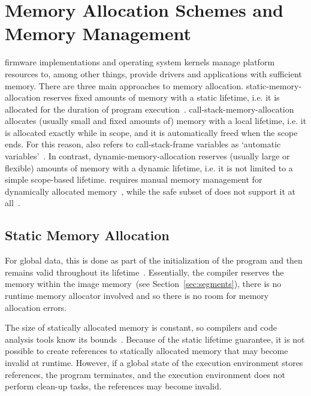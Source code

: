\section{Memory Allocation Schemes and Memory Management}

\Gls{firmware} implementations and operating system kernels manage platform resources to, among other things, provide drivers and applications with sufficient memory. There are three main approaches to memory allocation. \Gls{static-memory-allocation} reserves fixed amounts of memory with a static lifetime, i.e. it is allocated for the duration of program execution~\cite{ISO:2018:III,rust-ref}. \Gls{call-stack-memory-allocation} allocates (usually small and fixed amounts of) memory with a local lifetime, i.e. it is allocated exactly while in scope, and it is automatically freed when the scope ends. For this reason,  also refers to \gls{call-stack-frame} variables as `automatic variables'~\cite{ISO:2018:III}. In contrast, \gls{dynamic-memory-allocation} reserves (usually large or flexible) amounts of memory with a dynamic lifetime, i.e. it is not limited to a simple scope-based lifetime.  requires manual memory management for dynamically allocated memory~\cite{ISO:2018:III}, while the safe subset of  does not support it at all~\cite{rust-ref}.

\subsection{Static Memory Allocation}
\label{sec:static_mem_alloc}

For global data, this is done as part of the initialization of the program and then remains valid throughout its lifetime~\cite{ISO:2018:III,rust-ref}. Essentially, the compiler reserves the memory within the \gls{image} memory~(see Section~\ref{sec:segments}), there is no runtime memory allocator involved and so there is no room for memory allocation errors.

The size of statically allocated memory is constant, so compilers and code analysis tools know its bounds~\cite{ISO:2018:III,rust-ref}. Because of the static lifetime guarantee, it is not possible to create references to statically allocated memory that may become invalid at runtime. However, if a global state of the execution environment stores references, the program terminates, and the execution environment does not perform clean-up tasks, the references may become invalid.

